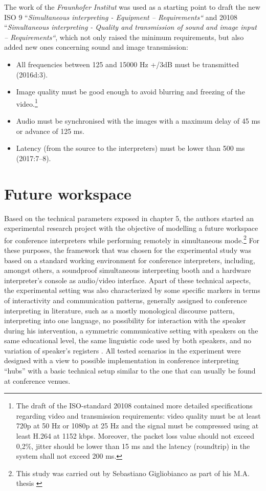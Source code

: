 \documentclass[output=paper]{langsci/langscibook}
\begin{document}
The work of the \textit{Fraunhofer Institut} was used as a starting point to draft the new ISO \citealt{Standards2010}9 “\textit{Simultaneous interpreting - Equipment – Requirements“} and 20108 “\textit{Simultaneous interpreting - Quality and transmission of sound and image input – Requirements“}, which not only raised the minimum requirements, but also added new ones concerning sound and image transmission:

\begin{itemize}
\item All frequencies between 125 and 15000 Hz +/\textminus 3dB must be transmitted (2016d:3).
\item Image quality must be good enough to avoid blurring and freezing of the video.\footnote{The draft of the ISO-standard 20108 contained more detailed specifications regarding video and transmission requirements: video quality must be at least 720p at 50 Hz or 1080p at 25 Hz and the signal must be compressed using at least H.264 at 1152 kbps. Moreover, the packet loss value should not exceed 0,2\%, jitter should be lower than 15 ms and the latency (roundtrip) in the system shall not exceed 200 ms.}
\item Audio must be synchronised with the images with a maximum delay of 45 ms or advance of 125 ms.
\item Latency (from the source to the interpreters) must be lower than 500 ms (2017:7–8).
\end{itemize}
\section{Future workspace}

Based on the technical parameters exposed in chapter 5, the authors started an experimental research project with the objective of modelling a future workspace for conference interpreters while performing remotely in simultaneous mode.\footnote{This study was carried out by Sebastiano Gigliobianco as part of his M.A. thesis \citep{Gigliobianco2017}} For these purposes, the framework that was chosen for the experimental study was based on a standard working environment for conference interpreters, including, amongst others, a soundproof simultaneous interpreting booth and a hardware interpreter’s console as audio/video interface. Apart of these technical aspects, the experimental setting was also characterized by some specific markers in terms of interactivity and communication patterns, generally assigned to conference interpreting in literature, such as a mostly monological discourse pattern, interpreting into one language, no possibility for interaction with the speaker during his intervention, a symmetric communicative setting with speakers on the same educational level, the same linguistic code used by both speakers, and no variation of speaker’s registers \citep[582-583]{Angelelli2000}. All tested scenarios in the experiment were designed with a view to possible implementation in conference interpreting “hubs” with a basic technical setup similar to the one that can usually be found at conference venues.
\end{document}
